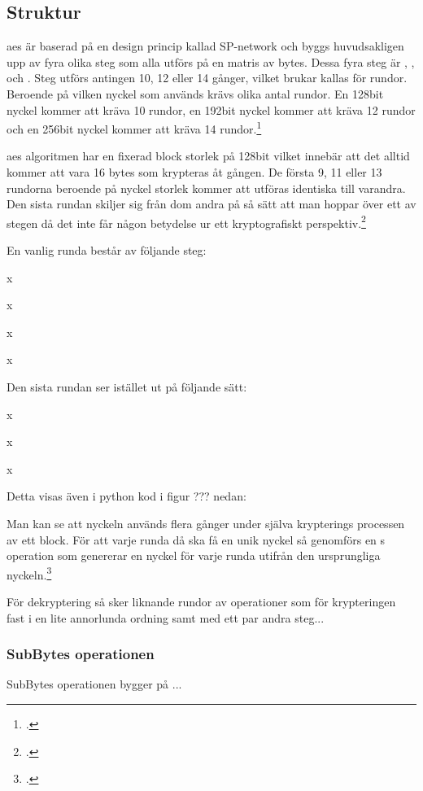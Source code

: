 \subsection{Struktur}
\label{sec:aes-structure}
\acrshort{aes} är baserad på en design princip kallad \gls{SP-network} och byggs huvudsakligen upp av fyra olika steg som alla utförs på en matris av \glspl{byte}. Dessa fyra steg är
, ,  och
. Steg utförs antingen 10, 12 eller 14 gånger, vilket brukar kallas för rundor. Beroende på vilken nyckel som används krävs olika antal rundor.
En 128bit nyckel kommer att kräva 10 rundor, en 192bit nyckel kommer att kräva 12 rundor och en 256bit nyckel kommer att kräva 14 rundor.\footcite{aes_wiki}

\acrshort{aes} algoritmen har en fixerad block storlek på 128bit vilket innebär att
det alltid kommer att vara 16 \glspl{byte} som krypteras åt gången. De första
9, 11 eller 13 rundorna beroende på nyckel storlek kommer att utföras identiska till varandra.
Den sista rundan skiljer sig från dom andra på så sätt att man hoppar över ett av stegen då
det inte får någon betydelse ur ett kryptografiskt perspektiv.\footcite{aes_wiki}

En vanlig runda består av följande steg:

x

x

x

x


Den sista rundan ser istället ut på följande sätt:

x

x

x

Detta visas även i \gls{python} kod i figur ??? nedan:



Man kan se att nyckeln används flera gånger under själva krypterings processen av ett block.
För att varje runda då ska få en unik nyckel så genomförs en s operation
som genererar en nyckel för varje runda utifrån den ursprungliga nyckeln.\footcite{aes_wiki}


För dekryptering så sker liknande rundor av operationer som för krypteringen fast
i en lite annorlunda ordning samt med ett par andra steg...



\subsubsection{SubBytes operationen}
\label{sec:aes-subbytes}
SubBytes operationen bygger på ...

